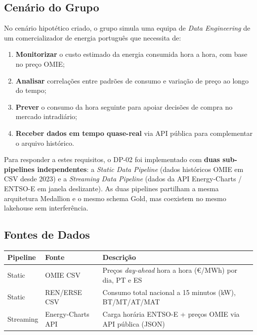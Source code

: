 \documentclass[11pt,a4paper]{article}
\begin{document}
\subsection{Cenário do Grupo}

No cenário hipotético criado, o grupo simula uma equipa de \textit{Data Engineering} de um comercializador de energia português que necessita de:

\begin{enumerate}[leftmargin=*,noitemsep]
  \item \textbf{Monitorizar} o custo estimado da energia consumida hora a hora, com base no preço OMIE;
  \item \textbf{Analisar} correlações entre padrões de consumo e variação de preço ao longo do tempo;
  \item \textbf{Prever} o consumo da hora seguinte para apoiar decisões de compra no mercado intradiário;
  \item \textbf{Receber dados em tempo quase-real} via API pública para complementar o arquivo histórico.
\end{enumerate}

Para responder a estes requisitos, o DP-02 foi implementado com \textbf{duas sub-pipelines independentes}: a \textit{Static Data Pipeline} (dados históricos OMIE em CSV desde 2023) e a \textit{Streaming Data Pipeline} (dados da API Energy-Charts / ENTSO-E em janela deslizante). As duas pipelines partilham a mesma arquitetura Medallion e o mesmo schema Gold, mas coexistem no mesmo lakehouse sem interferência.

\subsection{Fontes de Dados}

\begin{table}[h!]
\centering
\begin{tabularx}{\linewidth}{llX}
\toprule
\textbf{Pipeline} & \textbf{Fonte} & \textbf{Descrição} \\
\midrule
Static & OMIE CSV & Preços \textit{day-ahead} hora a hora (€/MWh) por dia, PT e ES \\
Static & REN/ERSE CSV & Consumo total nacional a 15 minutos (kW), BT/MT/AT/MAT \\
Streaming & Energy-Charts API & Carga horária ENTSO-E + preços OMIE via API pública (JSON) \\
\bottomrule
\end{tabularx}
\end{table}
\end{document}
